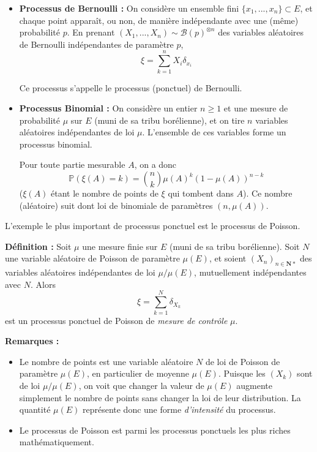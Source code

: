 \documentclass[12pt]{article}
\let\oldsum\sum
\renewcommand{\sum}{\oldsum\limits}
\begin{document}
\begin{itemize}

  \item \textbf{Processus de Bernoulli :} On considère un ensemble fini $\{x_1,...,x_n\} \subset E$, et chaque point apparaît, ou non, de manière indépendante avec une (même) probabilité $p$. En prenant $ (X_1,...,X_n) \sim \mathcal B(p)^{\otimes n}$ des variables aléatoires de Bernoulli indépendantes de paramètre $p$, $$ \xi = \sum_{k=1}^n X_i \delta_{x_i} $$

Ce processus s'appelle le processus (ponctuel) de Bernoulli. 

  \item \textbf{Processus Binomial :} On considère un entier $n \geqslant 1$ et une mesure de probabilité $\mu$ sur $E$ (muni de sa tribu borélienne), et on tire $n$ variables aléatoires indépendantes de loi $\mu$. L'ensemble de ces variables forme un processus binomial.

  Pour toute partie mesurable $A$, on a donc $$ \mathbb P(\xi(A) = k) = \binom{n}{k}\mu(A)^k (1-\mu(A))^{n-k} $$ ($ \xi(A) $ étant le nombre de points de $ \xi $ qui tombent dans $A$). Ce nombre (aléatoire) suit dont loi de binomiale de paramètres $ (n,\mu(A)) $.

\end{itemize}

L'exemple le plus important de processus ponctuel est le processus de Poisson.

\textbf{Définition :} Soit $\mu$ une mesure finie sur $E$ (muni de sa tribu borélienne). Soit $N$ une variable aléatoire de Poisson de paramètre $ \mu(E) $, et soient $(X_n)_{n \in \mathbf N*}$ des variables aléatoires indépendantes de loi $ \mu/\mu(E)$, mutuellement indépendantes avec $N$. Alors $$ \xi = \sum_{k=1}^N \delta_{X_k} $$ est un processus ponctuel de Poisson de \textit{mesure de contrôle} $\mu$.

\textbf{Remarques :}

\begin{itemize}

  \item Le nombre de points est une variable aléatoire $N$ de loi de Poisson de paramètre $\mu(E)$, en particulier de moyenne $\mu(E)$. Puisque les $(X_k)$ sont de loi $\mu/\mu(E)$, on voit que changer la valeur de $\mu(E)$ augmente simplement le nombre de points sans changer la loi de leur distribution. La quantité $\mu(E)$ représente donc une forme \textit{d'intensité} du processus.

  \item Le processus de Poisson est parmi les processus ponctuels les plus riches mathématiquement.

\end{itemize}
\end{document}
